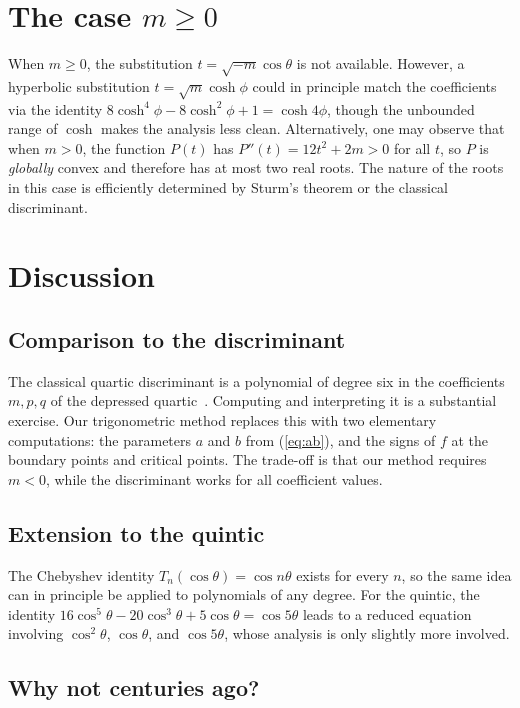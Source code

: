 \documentclass[12pt]{article}
\theoremstyle{definition}
\theoremstyle{remark}
\begin{document}
\section{The case $m \geq 0$}\label{sec:mgeq0}

When $m \geq 0$, the substitution $t = \sqrt{-m}\cos\theta$ is not available. However, a hyperbolic substitution $t = \sqrt{m}\cosh\phi$ could in principle match the coefficients via the identity $8\cosh^4\!\phi - 8\cosh^2\!\phi + 1 = \cosh 4\phi$, though the unbounded range of $\cosh$ makes the analysis less clean. Alternatively, one may observe that when $m > 0$, the function $P(t)$ has $P''(t) = 12t^2 + 2m > 0$ for all $t$, so $P$ is \emph{globally} convex and therefore has at most two real roots. The nature of the roots in this case is efficiently determined by Sturm's theorem or the classical discriminant.

\section{Discussion}

\subsection{Comparison to the discriminant}

The classical quartic discriminant is a polynomial of degree six in the coefficients $m, p, q$ of the depressed quartic~\cite{Rees1922}. Computing and interpreting it is a substantial exercise. Our trigonometric method replaces this with two elementary computations: the parameters $a$ and $b$ from (\ref{eq:ab}), and the signs of $f$ at the boundary points and critical points. The trade-off is that our method requires $m < 0$, while the discriminant works for all coefficient values.

\subsection{Extension to the quintic}

The Chebyshev identity $T_n(\cos\theta) = \cos n\theta$ exists for every $n$, so the same idea can in principle be applied to polynomials of any degree. For the quintic, the identity $16\cos^5\!\theta - 20\cos^3\!\theta + 5\cos\theta = \cos 5\theta$ leads to a reduced equation involving $\cos^2\!\theta$, $\cos\theta$, and $\cos 5\theta$, whose analysis is only slightly more involved.

\subsection{Why not centuries ago?}
\end{document}

